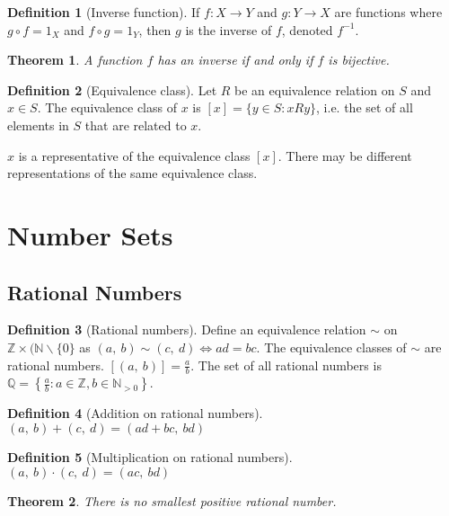\documentclass{article}
\newcommand*{\N}{\mathbb{N}}
\newcommand*{\Z}{\mathbb{Z}}
\newcommand*{\Q}{\mathbb{Q}}
\theoremstyle{plain}
\newtheorem{theorem}{Theorem}[section]
\numberwithin{theorem}{subsection}
\theoremstyle{definition}
\newtheorem{definition}{Definition}[section]
\numberwithin{definition}{subsection}
\theoremstyle{remark}
\numberwithin{note}{subsection}
\begin{document}
%
\begin{definition}[Inverse function]
    If $f:X \to Y$ and $g:Y \to X$ are functions where
    $g \circ f = 1_X$ and $f \circ g = 1_Y$,
    then $g$ is the inverse of $f$, denoted $f^{-1}$.
\end{definition}
%
\begin{theorem}
    A function $f$ has an inverse if and only if $f$ is bijective.
\end{theorem}
%
\begin{definition}[Equivalence class]
    Let $R$ be an equivalence relation on $S$ and $x \in S$.
    The equivalence class of $x$ is $[x] = \{y \in S : xRy\}$,
    i.e. the set of all elements in $S$ that are related to $x$.

    $x$ is a representative of the equivalence class $[x]$.
    There may be different representations of the same equivalence class.
\end{definition}
%
\section{Number Sets}
\subsection{Rational Numbers}
\begin{definition}[Rational numbers]
    Define an equivalence relation $\sim$ on $\Z \times (\N\backslash\{0\}$
    as $(a,\: b) \sim (c,\: d) \iff ad=bc$.
    The equivalence classes of $\sim$ are rational numbers.
    $[(a,\: b)] = \frac{a}{b}$.
    The set of all rational numbers is
    $\Q = \left\{ \frac{a}{b} : a\in \Z, b\in \N_{>0} \right\}$.
\end{definition}
%
\begin{definition}[Addition on rational numbers]
    $(a,\: b) + (c,\: d) = (ad+bc,\: bd)$
\end{definition}
%
\begin{definition}[Multiplication on rational numbers]
    $(a,\: b) \cdot (c,\: d) = (ac,\: bd)$
\end{definition}
\begin{theorem}
    There is no smallest positive rational number.
\end{theorem}
%
\end{document}
